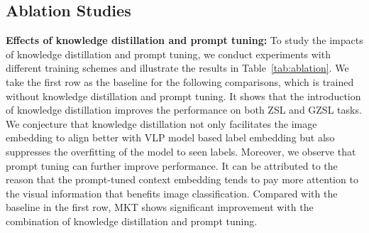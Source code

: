 \documentclass[letterpaper]{article} %
\begin{document}
\subsection{Ablation Studies}
\noindent\textbf{Effects of knowledge distillation and prompt tuning:}
To study the impacts of knowledge distillation and prompt tuning, 
we conduct experiments with different training schemes and illustrate the results in Table~\ref{tab:ablation}.
We take the first row as the baseline for the following comparisons, which is trained without knowledge distillation and prompt tuning.
It shows that the introduction of knowledge distillation improves the performance on both ZSL and GZSL tasks.
We conjecture that knowledge distillation not only facilitates the image embedding to align better with VLP model based label embedding but also suppresses the overfitting of the model to seen labels.
Moreover, we observe that prompt tuning can further improve performance.
It can be attributed to the reason that the prompt-tuned context embedding tends to pay more attention to the visual information that benefits image classification.
Compared with the baseline in the first row, MKT shows significant improvement with the combination of knowledge distillation and prompt tuning.
\end{document}
